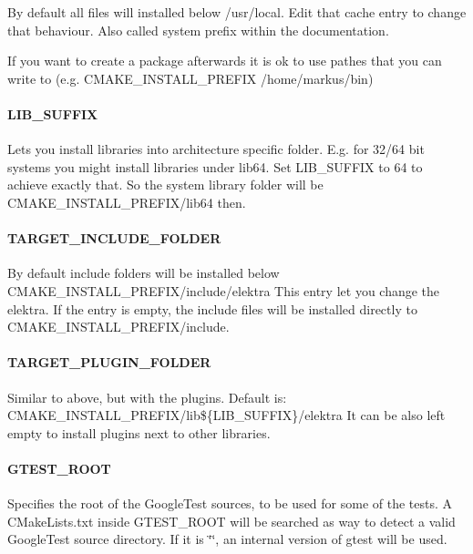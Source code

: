 By default all files will installed below /usr/local. Edit that cache entry to change that behaviour. Also called system prefix within the documentation.

If you want to create a package afterwards it is ok to use pathes that you can write to (e.\+g. C\+M\+A\+K\+E\+\_\+\+I\+N\+S\+T\+A\+L\+L\+\_\+\+P\+R\+E\+F\+I\+X /home/markus/bin)

\paragraph*{L\+I\+B\+\_\+\+S\+U\+F\+F\+I\+X}

Lets you install libraries into architecture specific folder. E.\+g. for 32/64 bit systems you might install libraries under lib64. Set L\+I\+B\+\_\+\+S\+U\+F\+F\+I\+X to 64 to achieve exactly that. So the system library folder will be C\+M\+A\+K\+E\+\_\+\+I\+N\+S\+T\+A\+L\+L\+\_\+\+P\+R\+E\+F\+I\+X/lib64 then.

\paragraph*{T\+A\+R\+G\+E\+T\+\_\+\+I\+N\+C\+L\+U\+D\+E\+\_\+\+F\+O\+L\+D\+E\+R}

By default include folders will be installed below C\+M\+A\+K\+E\+\_\+\+I\+N\+S\+T\+A\+L\+L\+\_\+\+P\+R\+E\+F\+I\+X/include/elektra This entry let you change the elektra. If the entry is empty, the include files will be installed directly to C\+M\+A\+K\+E\+\_\+\+I\+N\+S\+T\+A\+L\+L\+\_\+\+P\+R\+E\+F\+I\+X/include.

\paragraph*{T\+A\+R\+G\+E\+T\+\_\+\+P\+L\+U\+G\+I\+N\+\_\+\+F\+O\+L\+D\+E\+R}

Similar to above, but with the plugins. Default is\+: C\+M\+A\+K\+E\+\_\+\+I\+N\+S\+T\+A\+L\+L\+\_\+\+P\+R\+E\+F\+I\+X/lib\$\{L\+I\+B\+\_\+\+S\+U\+F\+F\+I\+X\}/elektra It can be also left empty to install plugins next to other libraries.

\paragraph*{G\+T\+E\+S\+T\+\_\+\+R\+O\+O\+T}

Specifies the root of the Google\+Test sources, to be used for some of the tests. A C\+Make\+Lists.\+txt inside G\+T\+E\+S\+T\+\_\+\+R\+O\+O\+T will be searched as way to detect a valid Google\+Test source directory. If it is \char`\"{}\char`\"{}, an internal version of gtest will be used.

